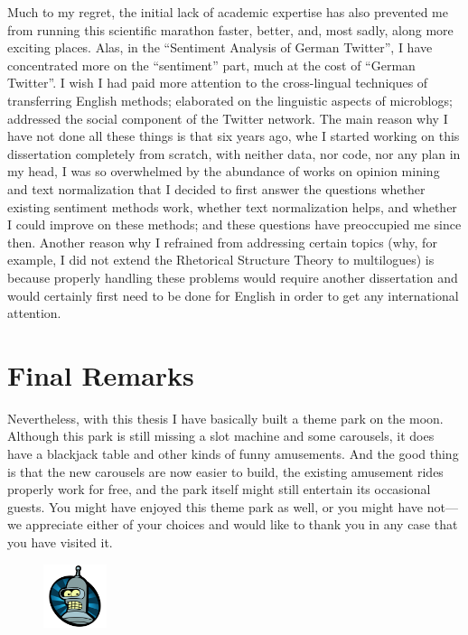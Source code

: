 Much to my regret, the initial lack of academic expertise has also
prevented me from running this scientific marathon faster, better,
and, most sadly, along more exciting places.  Alas, in the ``Sentiment
Analysis of German Twitter'', I have concentrated more on the
``sentiment'' part, much at the cost of ``German Twitter''.  I wish I
had paid more attention to the cross-lingual techniques of
transferring English methods; elaborated on the linguistic aspects of
microblogs; addressed the social component of the Twitter network.
The main reason why I have not done all these things is that six years
ago, whe I started working on this dissertation completely from
scratch, with neither data, nor code, nor any plan in my head, I was
so overwhelmed by the abundance of works on opinion mining and text
normalization that I decided to first answer the questions whether
existing sentiment methods work, whether text normalization helps, and
whether I could improve on these methods; and these questions have
preoccupied me since then.  Another reason why I refrained from
addressing certain topics (why, for example, I did not extend the
Rhetorical Structure Theory to multilogues) is because properly
handling these problems would require another dissertation and would
certainly first need to be done for English in order to get any
international attention.


\section*{Final Remarks}

Nevertheless, with this thesis I have basically built a theme park on
the moon.  Although this park is still missing a slot machine and some
carousels, it does have a blackjack table and other kinds of funny
amusements.  And the good thing is that the new carousels are now
easier to build, the existing amusement rides properly work for free,
and the park itself might still entertain its occasional guests.  You
might have enjoyed this theme park as well, or you might have not---we
appreciate either of your choices and would like to thank you in any
case that you have visited it.
\begin{figure}[htb]
  \centering \includegraphics[height=5em]{img/bender.png}
\end{figure}
